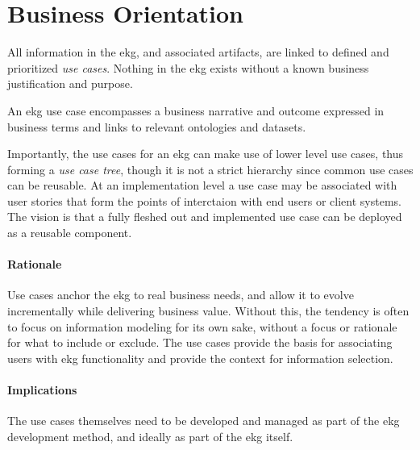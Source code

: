 \section{Business Orientation}\label{sec:ekg-principle-business-orientation}

All information in the \gls{ekg}, and associated artifacts, 
are linked to defined and prioritized \textit{use cases}.
Nothing in the \gls{ekg} exists without a known business justification and purpose.

An \gls{ekg} use case encompasses a business narrative and outcome expressed in 
business terms and links to relevant ontologies and \glspl{dataset}.

Importantly, the use cases for an \gls{ekg} can make use of lower level use cases, 
thus forming a \textit{use case tree}, though it is not a strict hierarchy 
since common use cases can be reusable. 
At an implementation level a use case may be associated with user stories that 
form the points of interctaion with end users or client systems.
The vision is that a fully fleshed out and implemented use case can be deployed as a reusable component.

\paragraph{Rationale}

Use cases anchor the \gls{ekg} to real business needs, and allow it to 
evolve incrementally while delivering business value. 
Without this, the tendency is often to focus on information modeling for its own sake, 
without a focus or rationale for what to include or exclude.
The use cases provide the basis for associating users with \gls{ekg} functionality 
and provide the context for information selection.

\paragraph{Implications}

The use cases themselves need to be developed and managed as part of the \gls{ekg} development method, 
and ideally as part of the \gls{ekg} itself.
